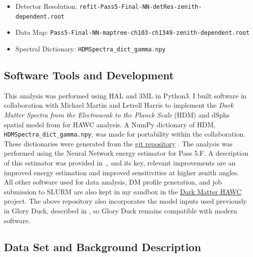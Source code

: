 \begin{itemize}
    \item Detector Resolution: \texttt{refit-Pass5-Final-NN-detRes-zenith-dependent.root}
    \item Data Map: \texttt{Pass5-Final-NN-maptree-ch103-ch1349-zenith-dependent.root}
    \item Spectral Dictionary: \texttt{HDMSpectra\_dict\_gamma.npy}
\end{itemize}

\subsection{Software Tools and Development}\label{sec:mtd_tools}

This analysis was performed using HAL and 3ML \cite{Abeysekara_2017, vianello2015multimission} in Python3.
I built software in collaboration with Michael Martin and Letrell Harris to implement the \emph{Dark Matter Spectra from the Electroweak to the Planck Scale} (HDM) \cite{HDMSpectra} and dSphs spatial model from \cite{DM_Strigari20} for HAWC analysis.
A NumPy dictionary of HDM, \texttt{HDMSpectra\_dict\_gamma.npy}, was made for portability within the collaboration.
These dictionaries were generated from the \href{https://github.com/nickrodd/HDMSpectra/tree/master}{git repository} \cite{HDMSpectra}.
The analysis was performed using the Neural Network energy estimator for Pass 5.F.
A description of this estimator was provided in ., and its key, relevant improvements are an improved energy estimation and improved sensitivities at higher zenith angles.
All other software used for data analysis, DM profile generation, and job submission to SLURM are also kept in my sandbox in the \href{https://gitlab.com/hawc-observatory/sandboxes/salaza82/dark_matter_hawc}{Dark Matter HAWC} project.
The above repository also incorporates the model inputs used previously in Glory Duck, described in , so Glory Duck remains compatible with modern software.

\subsection{Data Set and Background Description} \label{sec:mtd_data_bkgd}

